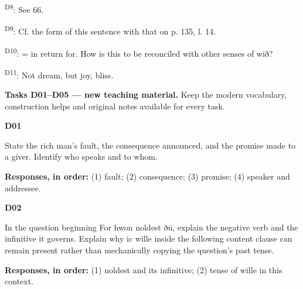 \textsuperscript{D8}: See 66.

\textsuperscript{D9}: Cf. the form of this sentence with that on p. 135, l. 14.

\textsuperscript{D10}: = in return for. How is this to be reconciled with other senses of wið?

\textsuperscript{D11}: Not dream, but joy, bliss.

\textbf{Tasks D01–D05 — new teaching material.} Keep the modern vocabulary, construction helps and original notes available for every task.

\par\begin{minipage}{\linewidth}\raggedright
\textbf{D01}

State the rich man’s fault, the consequence announced, and the promise made to a giver. Identify who speaks and to whom.

\textbf{Responses, in order:} (1) fault; (2) consequence; (3) promise; (4) speaker and addressee.

\end{minipage}\par\addvspace{4pt}

\par\begin{minipage}{\linewidth}\raggedright
\textbf{D02}

In the question beginning For hwon noldest ðū, explain the negative verb and the infinitive it governs. Explain why ic wille inside the following content clause can remain present rather than mechanically copying the question’s past tense.

\textbf{Responses, in order:} (1) noldest and its infinitive; (2) tense of wille in this context.

\end{minipage}\par\addvspace{4pt}


